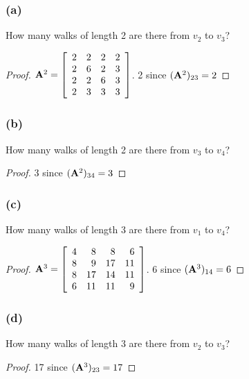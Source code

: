 \documentclass[14pt]{extarticle}
\begin{document}
\subsubsection{(a)}
How many walks of length 2 are there from \(v_2\) to \(v_3\)?
\begin{proof}
    \({\bf A}^2 =
    \left[
        \begin{array}{rrrr}
            2 & 2 & 2 & 2 \\
            2 & 6 & 2 & 3 \\
            2 & 2 & 6 & 3 \\
            2 & 3 & 3 & 3 \\
        \end{array}
        \right]
    \). 2 since \(({\bf A}^2)_{23} = 2\)
\end{proof}

\subsubsection{(b)}
How many walks of length 2 are there from \(v_3\) to \(v_4\)?
\begin{proof}
    3 since \(({\bf A}^2)_{34} = 3\)
\end{proof}

\subsubsection{(c)}
How many walks of length 3 are there from \(v_1\) to \(v_4\)?
\begin{proof}
    \({\bf A}^3 =
    \left[
        \begin{array}{rrrr}
            4 & 8  & 8  & 6  \\
            8 & 9  & 17 & 11 \\
            8 & 17 & 14 & 11 \\
            6 & 11 & 11 & 9  \\
        \end{array}
        \right]
    \). 6 since \(({\bf A}^3)_{14} = 6\)
\end{proof}

\subsubsection{(d)}
How many walks of length 3 are there from \(v_2\) to \(v_3\)?
\begin{proof}
    17 since \(({\bf A}^3)_{23} = 17\)
\end{proof}
\end{document}
